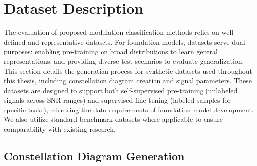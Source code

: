 

\section{Dataset Description}

The evaluation of proposed modulation classification methods relies on well-defined and representative datasets. For foundation models, datasets serve dual purposes: enabling pre-training on broad distributions to learn general representations, and providing diverse test scenarios to evaluate generalization. This section details the generation process for synthetic datasets used throughout this thesis, including constellation diagram creation and signal parameters. These datasets are designed to support both self-supervised pre-training (unlabeled signals across SNR ranges) and supervised fine-tuning (labeled samples for specific tasks), mirroring the data requirements of foundation model development. We also utilize standard benchmark datasets where applicable to ensure comparability with existing research.

\subsection{Constellation Diagram Generation}

